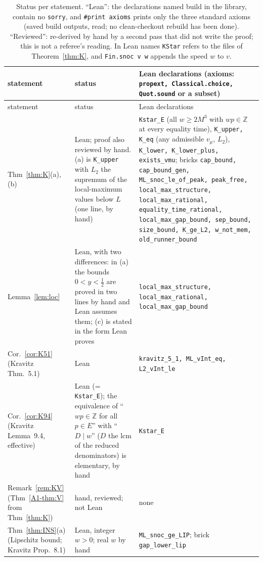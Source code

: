 \documentclass[11pt]{article}
\theoremstyle{definition}
\theoremstyle{remark}
\newcommand{\ZZ}{\mathbb{Z}}
\newcommand{\xA}[1]{\ref{A1-#1}}
\begin{document}
{\footnotesize
\setlength{\tabcolsep}{4pt}
\begin{longtable}{@{}p{}p{}p{}@{}}
\caption{Status per statement. ``Lean'': the declarations named build in the library, contain no \texttt{sorry}, and \texttt{\#print axioms} prints only the three standard axioms (saved build outputs, read; no clean-checkout rebuild has been done). ``Reviewed'': re-derived by hand by a second pass that did not write the proof; this is not a referee's reading. In Lean names \texttt{KStar} refers to the files of Theorem~\ref{thm:K}, and \texttt{Fin.snoc v w} appends the speed $w$ to $v$.}\label{tab:status}\\
\toprule
statement & status & Lean declarations (axioms: \texttt{propext, Classical.choice, Quot.sound} or a subset) \\
\midrule
\endfirsthead
\toprule
statement & status & Lean declarations \\
\midrule
\endhead
\bottomrule
\endfoot
Thm~\ref{thm:K}(a),(b) & Lean; proof also reviewed by hand. (a) is \texttt{K\_upper} with $L_2$ the supremum of the local-maximum values below $L$ (one line, by hand) & \texttt{Kstar\_E} (all $w\ge2M^3$ with $wp\in\ZZ$ at every equality time), \texttt{K\_upper, K\_eq} (any admissible $v_\mu$, $L_2$), \texttt{K\_lower, K\_lower\_plus, exists\_vmu}; bricks \texttt{cap\_bound, cap\_bound\_gen, ML\_snoc\_le\_of\_peak, peak\_free, local\_max\_structure, local\_max\_rational, equality\_time\_rational, local\_max\_gap\_bound, sep\_bound, size\_bound, K\_ge\_L2, w\_not\_mem, old\_runner\_bound} \\
Lemma~\ref{lem:loc} & Lean, with two differences: in (a) the bounds $0<y<\frac12$ are proved in two lines by hand and Lean assumes them; (c) is stated in the form Lean proves & \texttt{local\_max\_structure, local\_max\_rational, local\_max\_gap\_bound} \\
Cor.~\ref{cor:K51} (Kravitz Thm.~5.1) & Lean & \texttt{kravitz\_5\_1, ML\_vInt\_eq, L2\_vInt\_le} \\
Cor.~\ref{cor:K94} (Kravitz Lemma~9.4, effective) & Lean (= \texttt{Kstar\_E}); the equivalence of ``$wp\in\ZZ$ for all $p\in E$'' with ``$D\mid w$'' ($D$ the lcm of the reduced denominators) is elementary, by hand & \texttt{Kstar\_E} \\
Remark~\ref{rem:KV} (Thm~\xA{thm:V} from Thm~\ref{thm:K}) & hand, reviewed; not Lean & none \\
Thm~\ref{thm:INS}(a) (Lipschitz bound; Kravitz Prop.~8.1) & Lean, integer $w>0$; real $w$ by hand & \texttt{ML\_snoc\_ge\_LIP}; brick \texttt{gap\_lower\_lip} \\

\end{longtable}}
\end{document}
